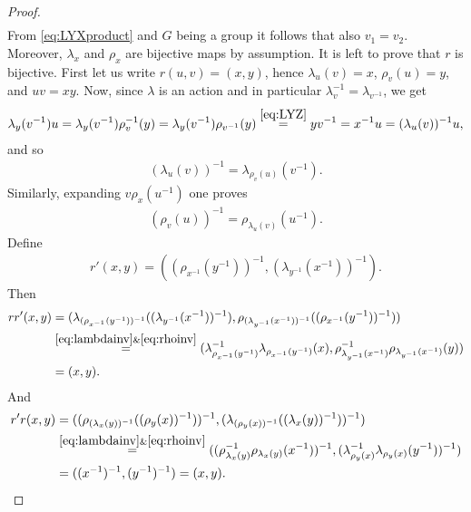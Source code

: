 \begin{proof}
\begin{align*}
    \end{align*}
    From \eqref{eq:LYXproduct} and $G$ being a group it follows that also $v_1=v_2$.
    Moreover, $\lambda_x$ and $\rho_x$ are bijective maps by assumption. 
    It is left to prove that $r$ is bijective.
    First let us write $r(u,v)=(x,y)$, hence $\lambda_u(v)=x$, $\rho_v(u)=y$, and $uv=xy$. Now, since $\lambda$ is an action and in particular $\lambda^{-1}_v=\lambda_{v^{-1}}$, we get 
    \begin{align*}
        \lambda_y(v^{-1})u = \lambda_y(v^{-1})\rho^{-1}_v(y) = \lambda_y(v^{-1})\rho_{v^{-1}}(y) \overset{\eqref{eq:LYZ}}{=} yv^{-1} = x^{-1}u = (\lambda_u(v))^{-1}u,
    \end{align*}
    and so 
    \begin{align}\label{eq:lambdainv}
        (\lambda_u(v))^{-1}=\lambda_{\rho_v(u)}(v^{-1}).
    \end{align}
    Similarly, expanding $v\rho_x(u^{-1})$ one proves
    \begin{align}\label{eq:rhoinv}
        (\rho_v(u))^{-1}=\rho_{\lambda_u(v)}(u^{-1}).
    \end{align}
    Define
    \begin{align*}
        r'(x,y)=((\rho_{x^{-1}}(y^{-1}))^{-1},(\lambda_{y^{-1}}(x^{-1}))^{-1}).
    \end{align*}
    Then
    \begin{align*}
        rr'(x,y) &= (\lambda_{(\rho_{x^{-1}}(y^{-1}))^{-1}}((\lambda_{y^{-1}}(x^{-1}))^{-1}), \rho_{(\lambda_{y^{-1}}(x^{-1}))^{-1}}((\rho_{x^{-1}}(y^{-1}))^{-1}))\\
        &\overset{\eqref{eq:lambdainv}\&\eqref{eq:rhoinv}}{=}(\lambda^{-1}_{\rho_{x^{-1}}(y^{-1})}\lambda_{\rho_{x^{-1}}(y^{-1})}(x),\rho^{-1}_{\lambda_{y^{-1}}(x^{-1})}\rho_{\lambda_{y^{-1}}(x^{-1})}(y)) \\
        &=(x,y).
    \end{align*}
    And
    \begin{align*}
        r'r(x,y) &= ((\rho_{(\lambda_x(y))^{-1}}((\rho_y(x))^{-1}))^{-1},(\lambda_{(\rho_y(x))^{-1}}((\lambda_x(y))^{-1}))^{-1})\\
        &\overset{\eqref{eq:lambdainv}\&\eqref{eq:rhoinv}}{=} ( (\rho^{-1}_{\lambda_x(y)}\rho_{\lambda_x(y)}(x^{-1}))^{-1}, (\lambda^{-1}_{\rho_y(x)}\lambda_{\rho_y(x)}(y^{-1}))^{-1})\\
        &=((x^{-1})^{-1},(y^{-1})^{-1}) = (x,y).
    \end{align*}
\end{proof}



